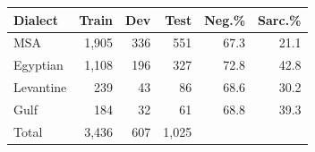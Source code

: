 \begin{tabular}{lrrrrr}
\toprule
\textbf{Dialect} & \textbf{Train} & \textbf{Dev} & \textbf{Test} & \textbf{Neg.\%} & \textbf{Sarc.\%} \\
\midrule
MSA & 1,905 & 336 & 551 & 67.3 & 21.1 \\
Egyptian & 1,108 & 196 & 327 & 72.8 & 42.8 \\
Levantine & 239 & 43 & 86 & 68.6 & 30.2 \\
Gulf & 184 & 32 & 61 & 68.8 & 39.3 \\
\midrule
Total & 3,436 & 607 & 1,025 & & \\
\bottomrule
\end{tabular}
